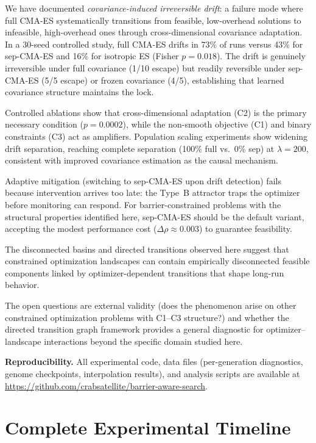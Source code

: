 \documentclass[twoside]{article}
\begin{document}
We have documented \emph{covariance-induced irreversible drift}: a failure mode
where full CMA-ES systematically transitions from feasible, low-overhead
solutions to infeasible, high-overhead ones through cross-dimensional
covariance adaptation. In a 30-seed controlled study, full CMA-ES drifts in
73\% of runs versus 43\% for sep-CMA-ES and 16\% for isotropic ES (Fisher
$p = 0.018$). The drift is genuinely irreversible under full covariance
(1/10 escape) but readily reversible under sep-CMA-ES (5/5 escape) or
frozen covariance (4/5), establishing that learned covariance structure
maintains the lock.

Controlled ablations show that cross-dimensional adaptation (C2) is the
primary necessary condition ($p = 0.0002$), while the non-smooth objective
(C1) and binary constraints (C3) act as amplifiers. Population scaling
experiments show widening drift separation, reaching complete
separation (100\% full vs.\ 0\% sep) at $\lambda = 200$, consistent
with improved covariance estimation as the causal mechanism.

Adaptive mitigation (switching to sep-CMA-ES upon drift detection) fails
because intervention arrives too late: the Type~B attractor traps the
optimizer before monitoring can respond. For
barrier-constrained problems with the structural properties identified here,
sep-CMA-ES should be the default variant, accepting the modest performance
cost ($\Delta\rho \approx 0.003$) to guarantee feasibility.

The disconnected basins and directed transitions observed here
suggest that constrained optimization landscapes can contain
empirically disconnected feasible components linked by
optimizer-dependent transitions that shape long-run behavior.

The open questions are external validity (does the phenomenon
arise on other constrained optimization problems with C1--C3
structure?) and whether the directed transition graph framework provides
a general diagnostic for optimizer--landscape interactions beyond the
specific domain studied here.

\textbf{Reproducibility.}
All experimental code, data files (per-generation diagnostics, genome
checkpoints, interpolation results), and analysis scripts are available at
\url{https://github.com/crabsatellite/barrier-aware-search}.
\appendix

\section{Complete Experimental Timeline}
\label{app:timeline}
\end{document}
